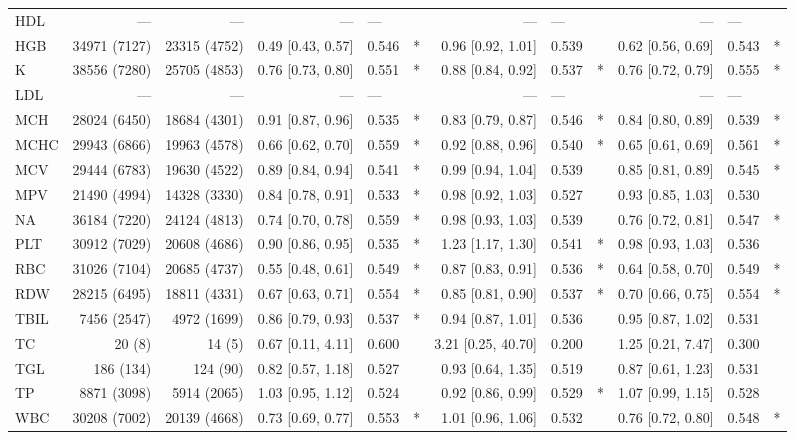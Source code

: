 \begin{table}[ht]
\begin{tabular}{lrrrlcrlcrlc}
HDL & --- & --- & --- & --- &  & --- & --- &  & --- & --- &  \\
HGB & 34971 (7127) & 23315 (4752) & 0.49 [0.43, 0.57] & 0.546 & * & 0.96 [0.92, 1.01] & 0.539 &  & 0.62 [0.56, 0.69] & 0.543 & * \\
K & 38556 (7280) & 25705 (4853) & 0.76 [0.73, 0.80] & 0.551 & * & 0.88 [0.84, 0.92] & 0.537 & * & 0.76 [0.72, 0.79] & 0.555 & * \\
LDL & --- & --- & --- & --- &  & --- & --- &  & --- & --- &  \\
MCH & 28024 (6450) & 18684 (4301) & 0.91 [0.87, 0.96] & 0.535 & * & 0.83 [0.79, 0.87] & 0.546 & * & 0.84 [0.80, 0.89] & 0.539 & * \\
MCHC & 29943 (6866) & 19963 (4578) & 0.66 [0.62, 0.70] & 0.559 & * & 0.92 [0.88, 0.96] & 0.540 & * & 0.65 [0.61, 0.69] & 0.561 & * \\
MCV & 29444 (6783) & 19630 (4522) & 0.89 [0.84, 0.94] & 0.541 & * & 0.99 [0.94, 1.04] & 0.539 &  & 0.85 [0.81, 0.89] & 0.545 & * \\
MPV & 21490 (4994) & 14328 (3330) & 0.84 [0.78, 0.91] & 0.533 & * & 0.98 [0.92, 1.03] & 0.527 &  & 0.93 [0.85, 1.03] & 0.530 &  \\
NA & 36184 (7220) & 24124 (4813) & 0.74 [0.70, 0.78] & 0.559 & * & 0.98 [0.93, 1.03] & 0.539 &  & 0.76 [0.72, 0.81] & 0.547 & * \\
PLT & 30912 (7029) & 20608 (4686) & 0.90 [0.86, 0.95] & 0.535 & * & 1.23 [1.17, 1.30] & 0.541 & * & 0.98 [0.93, 1.03] & 0.536 &  \\
RBC & 31026 (7104) & 20685 (4737) & 0.55 [0.48, 0.61] & 0.549 & * & 0.87 [0.83, 0.91] & 0.536 & * & 0.64 [0.58, 0.70] & 0.549 & * \\
RDW & 28215 (6495) & 18811 (4331) & 0.67 [0.63, 0.71] & 0.554 & * & 0.85 [0.81, 0.90] & 0.537 & * & 0.70 [0.66, 0.75] & 0.554 & * \\
TBIL & 7456 (2547) & 4972 (1699) & 0.86 [0.79, 0.93] & 0.537 & * & 0.94 [0.87, 1.01] & 0.536 &  & 0.95 [0.87, 1.02] & 0.531 &  \\
TC & 20 (8) & 14 (5) & 0.67 [0.11, 4.11] & 0.600 &  & 3.21 [0.25, 40.70] & 0.200 &  & 1.25 [0.21, 7.47] & 0.300 &  \\
TGL & 186 (134) & 124 (90) & 0.82 [0.57, 1.18] & 0.527 &  & 0.93 [0.64, 1.35] & 0.519 &  & 0.87 [0.61, 1.23] & 0.531 &  \\
TP & 8871 (3098) & 5914 (2065) & 1.03 [0.95, 1.12] & 0.524 &  & 0.92 [0.86, 0.99] & 0.529 & * & 1.07 [0.99, 1.15] & 0.528 &  \\
WBC & 30208 (7002) & 20139 (4668) & 0.73 [0.69, 0.77] & 0.553 & * & 1.01 [0.96, 1.06] & 0.532 &  & 0.76 [0.72, 0.80] & 0.548 & * \\
\bottomrule
\end{tabular}
\end{table}